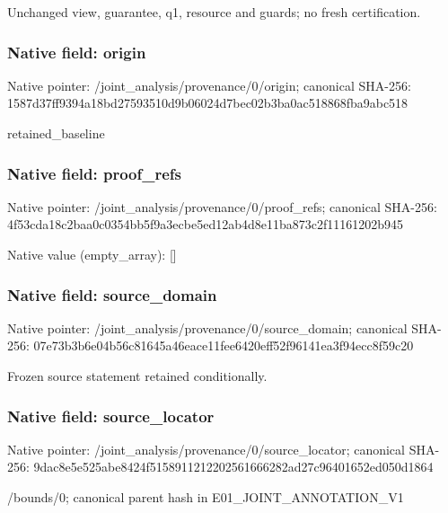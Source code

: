 \documentclass[10pt,a4paper]{article}
\begin{document}
\begingroup\raggedright\sloppy Unchanged view,\allowbreak{} guarantee,\allowbreak{} q1,\allowbreak{} resource and guards;\allowbreak{} no fresh certification.\par\endgroup

\subsubsection{Native field: origin}
Native pointer: /joint\_\allowbreak{}analysis/provenance/0/origin; canonical SHA-256: 1587d37ff9394a18bd27593510d9b06024d7bec02b3ba0ac518868fba9abc518

\begingroup\raggedright\sloppy retained\_\allowbreak{}baseline\par\endgroup

\subsubsection{Native field: proof\_\allowbreak{}refs}
Native pointer: /joint\_\allowbreak{}analysis/provenance/0/proof\_\allowbreak{}refs; canonical SHA-256: 4f53cda18c2baa0c0354bb5f9a3ecbe5ed12ab4d8e11ba873c2f11161202b945

Native value (empty\_\allowbreak{}array): []

\subsubsection{Native field: source\_\allowbreak{}domain}
Native pointer: /joint\_\allowbreak{}analysis/provenance/0/source\_\allowbreak{}domain; canonical SHA-256: 07e73b3b6e04b56c81645a46eace11fee6420eff52f96141ea3f94ecc8f59c20

\begingroup\raggedright\sloppy Frozen source statement retained conditionally.\par\endgroup

\subsubsection{Native field: source\_\allowbreak{}locator}
Native pointer: /joint\_\allowbreak{}analysis/provenance/0/source\_\allowbreak{}locator; canonical SHA-256: 9dac8e5e525abe8424f5158911212202561666282ad27c96401652ed050d1864

\begingroup\raggedright\sloppy /\allowbreak{}bounds/\allowbreak{}0;\allowbreak{} canonical parent hash in E01\_\allowbreak{}JOINT\_\allowbreak{}ANNOTATION\_\allowbreak{}V1\par\endgroup
\end{document}
